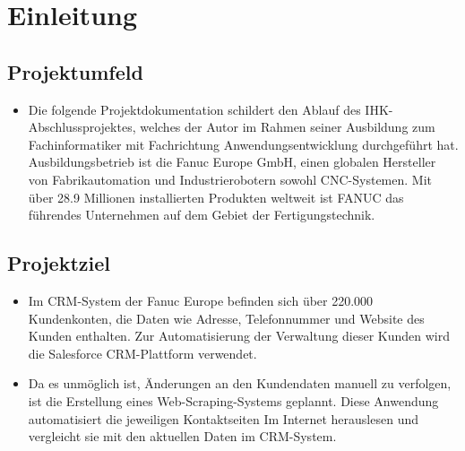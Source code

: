 \section{Einleitung}
\label{sec:Einleitung}


\subsection{Projektumfeld} 
\label{sec:Projektumfeld}
\begin{itemize}
	\item Die folgende Projektdokumentation schildert den Ablauf des IHK-Abschlussprojektes, welches der Autor im Rahmen seiner Ausbildung zum Fachinformatiker mit Fachrichtung Anwendungsentwicklung
	durchgeführt hat. Ausbildungsbetrieb ist die Fanuc Europe GmbH, einen globalen Hersteller von Fabrikautomation und Industrierobotern sowohl CNC-Systemen. Mit über 28.9 Millionen installierten Produkten weltweit ist FANUC das führendes Unternehmen
	auf dem Gebiet der Fertigungstechnik.
\end{itemize}

\subsection{Projektziel} 
\label{sec:Projektziel}
\begin{itemize}
	\item Im CRM-System der Fanuc Europe befinden sich über 220.000 Kundenkonten, die Daten wie
	Adresse, Telefonnummer und Website des Kunden enthalten. Zur Automatisierung der
	Verwaltung dieser Kunden wird die Salesforce CRM-Plattform verwendet.
	\item Da es unmöglich ist, Änderungen an den Kundendaten manuell zu verfolgen, ist die Erstellung
	eines Web-Scraping-Systems geplannt. Diese Anwendung automatisiert die jeweiligen
	Kontaktseiten Im Internet herauslesen und vergleicht sie mit den aktuellen Daten im
	CRM-System.
\end{itemize}


